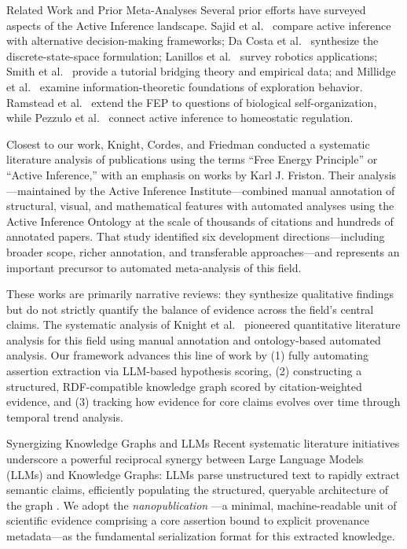 \documentclass[
  ignorenonframetext,
]{beamer}
\begin{document}
\begin{frame}{Related Work and Prior Meta-Analyses}
\protect{}\label{related-work-and-prior-meta-analyses}
Several prior efforts have surveyed aspects of the Active Inference
landscape. Sajid et al.~\citep{sajid2021active} compare active inference
with alternative decision-making frameworks; Da Costa et
al.~\citep{dacosta2020active} synthesize the discrete-state-space
formulation; Lanillos et al.~\citep{lanillos2021active} survey robotics
applications; Smith et al.~\citep{smith2021computational} provide a
tutorial bridging theory and empirical data; and Millidge et
al.~\citep{millidge2021understanding} examine information-theoretic
foundations of exploration behavior. Ramstead et
al.~\citep{ramstead2018answering} extend the FEP to questions of
biological self-organization, while Pezzulo et
al.~\citep{pezzulo2015active} connect active inference to homeostatic
regulation.

Closest to our work, Knight, Cordes, and Friedman \citep{knight2022fep}
conducted a systematic literature analysis of publications using the
terms ``Free Energy Principle'' or ``Active Inference,'' with an
emphasis on works by Karl J. Friston. Their analysis---maintained by the
Active Inference Institute---combined manual annotation of structural,
visual, and mathematical features with automated analyses using the
Active Inference Ontology at the scale of thousands of citations and
hundreds of annotated papers. That study identified six development
directions---including broader scope, richer annotation, and
transferable approaches---and represents an important precursor to
automated meta-analysis of this field.

These works are primarily narrative reviews: they synthesize qualitative
findings but do not strictly quantify the balance of evidence across the
field's central claims. The systematic analysis of Knight et
al.~\citep{knight2022fep} pioneered quantitative literature analysis for
this field using manual annotation and ontology-based automated
analysis. Our framework advances this line of work by (1) fully
automating assertion extraction via LLM-based hypothesis scoring, (2)
constructing a structured, RDF-compatible knowledge graph scored by
citation-weighted evidence, and (3) tracking how evidence for core
claims evolves over time through temporal trend analysis.
\end{frame}

\begin{frame}{Synergizing Knowledge Graphs and LLMs}
\protect{}\label{synergizing-knowledge-graphs-and-llms}
Recent systematic literature initiatives underscore a powerful
reciprocal synergy between Large Language Models (LLMs) and Knowledge
Graphs: LLMs parse unstructured text to rapidly extract semantic claims,
efficiently populating the structured, queryable architecture of the
graph \citep{quevedo2025combining, li2024unifying}. We adopt the
\emph{nanopublication} \citep{groth2010anatomy}---a minimal,
machine-readable unit of scientific evidence comprising a core assertion
bound to explicit provenance metadata---as the fundamental serialization
format for this extracted knowledge.
\end{frame}
\end{document}
